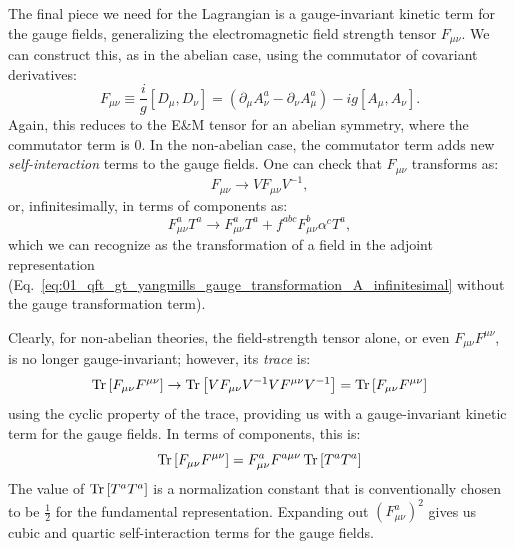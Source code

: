 The final piece we need for the Lagrangian is a gauge-invariant kinetic term for the gauge fields, generalizing the electromagnetic field strength tensor $F_{\mu\nu}$.
We can construct this, as in the abelian case, using the commutator of covariant derivatives:
\begin{equation}
	\label{eq:01_qft_gt_yangmills_field_strength}
	F_{\mu\nu} \equiv \frac{i}{g}[D_\mu, D_\nu] = (\partial_\mu A_\nu^a - \partial_\nu A_\mu^a) - ig[A_\mu, A_\nu].
\end{equation}
Again, this reduces to the E\&M tensor for an abelian symmetry, where the commutator term is $0$.
In the non-abelian case, the commutator term adds new \textit{self-interaction} terms to the gauge fields.
One can check that $F_{\mu\nu}$ transforms as:
\begin{equation}
	\label{eq:01_qft_gt_yangmills_field_strength_transformation}
	F_{\mu\nu} \rightarrow V F_{\mu\nu} V^{-1},
\end{equation}
or, infinitesimally, in terms of components as:
\begin{equation}
	\label{eq:01_qft_gt_yangmills_field_strength_transformation_infinitesimal}
	F_{\mu\nu}^aT^a \rightarrow F_{\mu\nu}^aT^a + f^{abc}F_{\mu\nu}^b\alpha^cT^a,
\end{equation}
which we can recognize as the transformation of a field in the adjoint representation (Eq.~\ref{eq:01_qft_gt_yangmills_gauge_transformation_A_infinitesimal} without the gauge transformation term).

Clearly, for non-abelian theories, the field-strength tensor alone, or even $F_{\mu\nu}F^{\mu\nu}$, is no longer gauge-invariant; however, its \textit{trace} is:
\begin{equation}
	\label{eq:01_qft_gt_yangmills_trace_field_strength_transformation}
	\mathrm{Tr}\left[F_{\mu\nu}F^{\mu\nu}\right] \rightarrow \mathrm{Tr}\left[V F_{\mu\nu}V^{-1} V F^{\mu\nu} V^{-1}\right] = \mathrm{Tr}\left[F_{\mu\nu}F^{\mu\nu}\right]
\end{equation}
using the cyclic property of the trace, providing us with a gauge-invariant kinetic term for the gauge fields.
In terms of components, this is:
\begin{equation}
	\label{eq:01_qft_gt_yangmills_trace_field_strength}
	\mathrm{Tr}\left[F_{\mu\nu}F^{\mu\nu}\right] = F_{\mu\nu}^aF^{a\mu\nu}\, \mathrm{Tr}\left[T^aT^a\right]
\end{equation}
The value of $\mathrm{Tr}\left[T^aT^a\right]$ is a normalization constant that is conventionally chosen to be $\frac{1}{2}$ for the fundamental representation.
Expanding out $(F_{\mu\nu}^a)^2$ gives us cubic and quartic self-interaction terms for the gauge fields.

